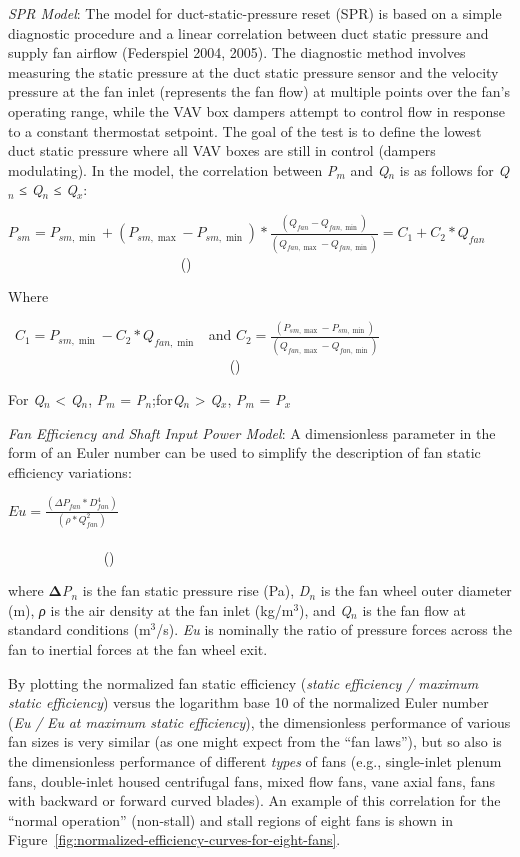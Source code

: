 \emph{SPR Model}: The model for duct-static-pressure reset (SPR) is based on a simple diagnostic procedure and a linear correlation between duct static pressure and supply fan airflow (Federspiel 2004, 2005). The diagnostic method involves measuring the static pressure at the duct static pressure sensor and the velocity pressure at the fan inlet (represents the fan flow) at multiple points over the fan's operating range, while the VAV box dampers attempt to control flow in response to a constant thermostat setpoint. The goal of the test is to define the lowest duct static pressure where all VAV boxes are still in control (dampers modulating). In the model, the correlation between \emph{P\(_{m}\)} and \emph{Q\(_{n}\)} is as follows for \emph{Q\(_{n}\)} ≤ \emph{Q\(_{n}\)} ≤ \emph{Q\(_{x}\)}:

\({P_{sm}} = {P_{sm,\min }} + \left( {{P_{sm,\max }} - {P_{sm,\min }}} \right)*\frac{{\left( {{Q_{fan}} - {Q_{fan,\min }}} \right)}}{{\left( {{Q_{fan,\max }} - {Q_{fan,\min }}} \right)}} = {C_1} + {C_2}*{Q_{fan}}\) ~~~~~~~~~~~~~~~~~~~~~~~~ ()

Where

~\({C_1} = {P_{sm,\min }} - {C_2}*{Q_{fan,\min }}\) ~and \({C_2} = \frac{{\left( {{P_{sm,\max }} - {P_{sm,\min }}} \right)}}{{\left( {{Q_{fan,\max }} - {Q_{fan,\min }}} \right)}}\) ~~~~~~~~~~~~~~~~~~~~~~~~~~~~~~~ ()

For \emph{Q\(_{n}\)} \textless{} \emph{Q\(_{n}\)}, \emph{P\(_{m}\)} = \emph{P\(_{n}\)};for\emph{Q\(_{n}\)} \textgreater{} \emph{Q\(_{x}\)}, \emph{P\(_{m}\)} = \emph{P\(_{x}\)}

\emph{Fan Efficiency and Shaft Input Power Model}: A dimensionless parameter in the form of an Euler number can be used to simplify the description of fan static efficiency variations:

\(Eu = \frac{{\left( {\Delta {P_{fan}} * D_{fan}^4} \right)}}{{\left( {\rho * Q_{fan}^2} \right)}}\) ~~~~~~~~~~~~~~~~~~~~~~~~~~~~~~~~~~~~~~~~~~~~~~~~~~~~~~~~~~~~~~~~~~~~~~~~~~~~~~~~~~~~~ ()

where \textbf{Δ}\emph{P\(_{n}\)} is the fan static pressure rise (Pa), \emph{D\(_{n}\)} is the fan wheel outer diameter (m), \emph{ρ} is the air density at the fan inlet (kg/m\(^{3}\)), and \emph{Q\(_{n}\)} is the fan flow at standard conditions (m\(^{3}\)/s). \emph{Eu} is nominally the ratio of pressure forces across the fan to inertial forces at the fan wheel exit.

By plotting the normalized fan static efficiency (\emph{static efficiency / maximum static efficiency}) versus the logarithm base 10 of the normalized Euler number (\emph{Eu} \emph{/} \emph{Eu} \emph{at maximum static efficiency}), the dimensionless performance of various fan sizes is very similar (as one might expect from the ``fan laws''), but so also is the dimensionless performance of different \emph{types} of fans (e.g., single-inlet plenum fans, double-inlet housed centrifugal fans, mixed flow fans, vane axial fans, fans with backward or forward curved blades). An example of this correlation for the ``normal operation'' (non-stall) and stall regions of eight fans is shown in Figure~\ref{fig:normalized-efficiency-curves-for-eight-fans}.


